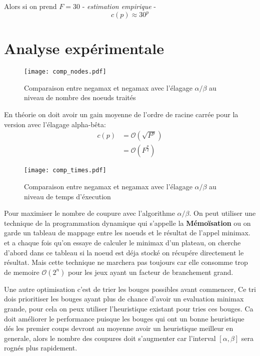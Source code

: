 \documentclass {article}
\begin{document}
Alors si on prend $F = 30$ - \textit{estimation empirique} -
\begin{equation}
   c(p) \approx 30^p
\end{equation}

\newpage
\section{Analyse expérimentale}
\begin{figure}[H]
  \texttt{[image: comp\_nodes.pdf]}
  \caption{Comparaison entre negamax et negamax avec l’élagage $\alpha/\beta$ au
   niveau de nombre des noeuds traités}
  \label{fig:comp_nodes}
\end{figure}

En théorie on doit avoir un gain moyenne de l'ordre de racine carrée pour la version
avec l'élagage alpha-bêta:
\begin{align*}
   c(p) &= \mathcal{O}(\sqrt{F^p}) \\
        &= \mathcal{O}(F^{\frac{p}{2}})
\end{align*}

\begin{figure}[H]
  \texttt{[image: comp\_times.pdf]}
  \caption{Comparaison entre negamax et negamax avec l’élagage $\alpha/\beta$ au
   niveau de temps d'éxecution}
  \label{fig:comp_times}
\end{figure}

Pour maximiser le nombre de coupure avec l'algorithme $\alpha/\beta$. On peut
utiliser une technique de la programmation dynamique qui s'appelle
la \textbf{Mémoïsation} ou on garde un tableau de mappage entre les noeuds et le
résultat de l'appel minimax. et a chaque fois qu'on essaye de calculer le
minimax d'un plateau, on cherche d'abord dans ce tableau si la noeud est
déja stocké on récupére directement le résultat. Mais cette technique ne
marchera pas toujours car elle consomme trop de memoire $\mathcal{O}(2^n)$
pour les jeux ayant un facteur de branchement grand.

Une autre optimisation c'est de trier les bouges possibles avant commencer, 
Ce tri dois prioritiser les bouges ayant plus de chance d'avoir un evaluation
minimax grande, pour cela on peux utiliser l'heuristique existant pour tries
ces bouges. Ca doit améliorer le performance puisque les bouges qui ont un
bonne heuristique dés les premier coups devront au moyenne avoir un heuristique
meilleur en generale, alors le nombre des coupures doit s'augmenter car
l'interval $[\alpha, \beta]$ sera rognés plus rapidement.
\end{document}
